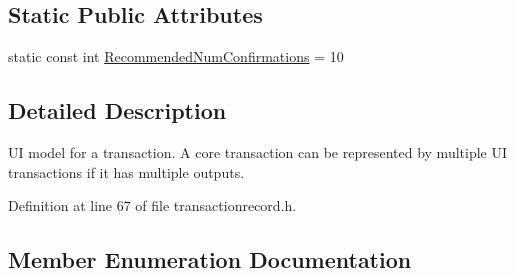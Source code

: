 \subsection*{Static Public Attributes}
\begin{DoxyCompactItemize}
\item 
static const int \hyperlink{class_transaction_record_a1cdf534b1ab2495c839f87beb053eaf8}{Recommended\+Num\+Confirmations} = 10
\end{DoxyCompactItemize}


\subsection{Detailed Description}
U\+I model for a transaction. A core transaction can be represented by multiple U\+I transactions if it has multiple outputs. 

Definition at line 67 of file transactionrecord.\+h.



\subsection{Member Enumeration Documentation}
\hypertarget{class_transaction_record_afb76f5876fba21c3d2c388b98a35d685}{}
